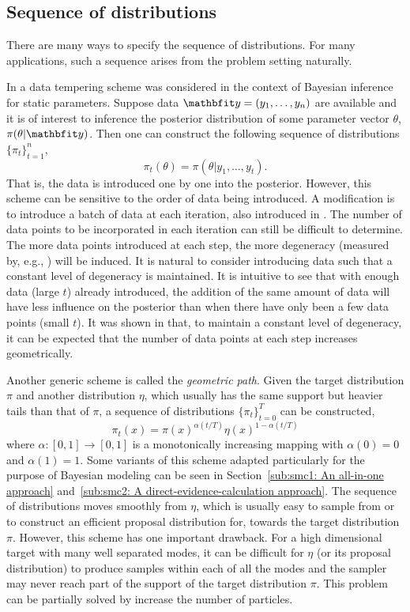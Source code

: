 \subsection{Sequence of distributions}
\label{sub:Sequence of distributions}

There are many ways to specify the sequence of distributions. For many applications, such a sequence arises from the problem setting naturally.

In \cite{Chopin:2002hg} a data tempering scheme was considered in the context of Bayesian inference for static parameters. Suppose data $\data = (y_1, \dots, y_n)$ are available and it is of interest to inference the posterior distribution of some parameter vector $\theta$, $\pi(\theta|\data)$. Then one can construct the following sequence of distributions $\{\pi_t\}_{t=1}^n$,
\begin{equation}
  \pi_t(\theta) = \pi(\theta|y_1,\dots,y_t).
\end{equation}
That is, the data is introduced one by one into the posterior. However, this scheme can be sensitive to the order of data being introduced. A modification is to introduce a batch of data at each iteration, also introduced in \cite{Chopin:2002hg}. The number of data points to be incorporated in each iteration can still be difficult to determine. The more data points introduced at each step, the more degeneracy (measured by, e.g., \ess) will be induced. It is natural to consider introducing data such that a constant level of degeneracy is maintained. It is intuitive to see that with enough data (large $t$) already introduced, the addition of the same amount of data will have less influence on the posterior than when there have only been a few data points (small $t$). It was shown in \cite{Chopin:2002hg} that, to maintain a constant level of degeneracy, it can be expected that the number of data points at each step increases geometrically.

Another generic scheme is called the \emph{geometric path}. Given the target distribution $\pi$ and another distribution $\eta$, which usually has the same support but heavier tails than that of $\pi$, a sequence of distributions $\{\pi_t\}_{t=0}^T$ can be constructed,
\begin{equation}
  \pi_t(x) = \pi(x)^{\alpha(t/T)}\eta(x)^{1-\alpha(t/T)}
\end{equation}
where $\alpha: [0,1] \to [0,1]$ is a monotonically increasing mapping with $\alpha(0) = 0$ and $\alpha(1) = 1$. Some variants of this scheme adapted particularly for the purpose of Bayesian modeling can be seen in Section~\ref{sub:smc1: An all-in-one approach} and~\ref{sub:smc2: A direct-evidence-calculation approach}. The sequence of distributions moves smoothly from $\eta$, which is usually easy to sample from or to construct an efficient proposal distribution for, towards the target distribution $\pi$. However, this scheme has one important drawback. For a high dimensional target with many well separated modes, it can be difficult for $\eta$ (or its proposal distribution) to produce samples within each of all the modes and the sampler may never reach part of the support of the target distribution $\pi$. This problem can be partially solved by increase the number of particles.

